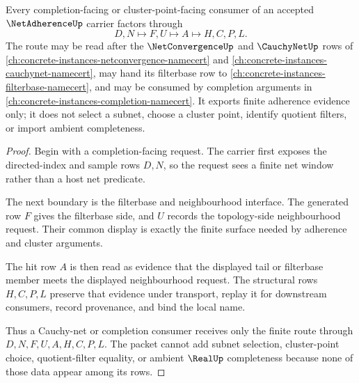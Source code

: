 \begin{theorem}
\label{thm:net-adherence-cauchy-net-cluster-route}
Every completion-facing or cluster-point-facing consumer of an accepted $\NetAdherenceUp$ carrier factors through
$$
D,N \longmapsto F,U \longmapsto A \longmapsto H,C,P,L .
$$
The route may be read after the $\NetConvergenceUp$ and $\CauchyNetUp$ rows of \autoref{ch:concrete-instances-netconvergence-namecert} and \autoref{ch:concrete-instances-cauchynet-namecert}, may hand its filterbase row to \autoref{ch:concrete-instances-filterbase-namecert}, and may be consumed by completion arguments in \autoref{ch:concrete-instances-completion-namecert}. It exports finite adherence evidence only; it does not select a subnet, choose a cluster point, identify quotient filters, or import ambient completeness.
\end{theorem}
\begin{proof}
Begin with a completion-facing request. The carrier first exposes the directed-index and sample rows $D,N$, so the request sees a finite net window rather than a host net predicate.

The next boundary is the filterbase and neighbourhood interface. The generated row $F$ gives the filterbase side, and $U$ records the topology-side neighbourhood request. Their common display is exactly the finite surface needed by adherence and cluster arguments.

The hit row $A$ is then read as evidence that the displayed tail or filterbase member meets the displayed neighbourhood request. The structural rows $H,C,P,L$ preserve that evidence under transport, replay it for downstream consumers, record provenance, and bind the local name.

Thus a Cauchy-net or completion consumer receives only the finite route through $D,N,F,U,A,H,C,P,L$. The packet cannot add subnet selection, cluster-point choice, quotient-filter equality, or ambient $\RealUp$ completeness because none of those data appear among its rows.
\end{proof}



